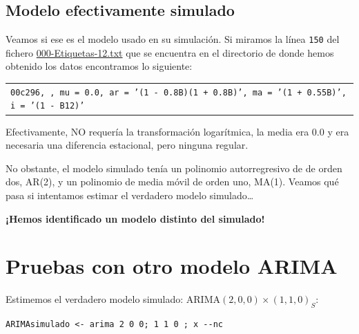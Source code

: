 \documentclass[10pt]{article}
\begin{document}
\subsection*{Modelo efectivamente simulado}
\label{sec:org4bd7ee3}

Veamos si ese es el modelo usado en su simulación. Si miramos la línea
\texttt{150} del fichero \href{IdentificaEstosARIMA/000-Etiquetas-12.txt}{000-Etiquetas-12.txt} que se encuentra en el directorio de
donde hemos obtenido los datos encontramos lo siguiente:
\medskip

\begin{center}
\begin{tabular}{l}
\texttt{00c296,	    ,	mu = 0.0,	ar = '(1 - 0.8B)(1 + 0.8B)', ma = '(1 + 0.55B)', i = '(1 - B12)'}\\
\end{tabular}
\end{center}

\medskip

Efectivamente, NO requería la transformación logarítmica, la media era
\(0.0\) y era necesaria una diferencia estacional, pero ninguna regular.

No obstante, el modelo simulado tenía un polinomio autorregresivo de
de orden dos, AR(2), y un polinomio de media móvil de orden uno,
MA(1). Veamos qué pasa si intentamos estimar el verdadero modelo
simulado\ldots{}

\textbf{¡Hemos identificado un modelo distinto del simulado!}
\section*{Pruebas con otro modelo ARIMA}
\label{sec:orgc03d676}

Estimemos el verdadero modelo simulado: ARIMA\((2,0,0)\times(1,1,0)_{S}\):

\begin{verbatim}
ARIMAsimulado <- arima 2 0 0; 1 1 0 ; x --nc 
\end{verbatim}
\end{document}
